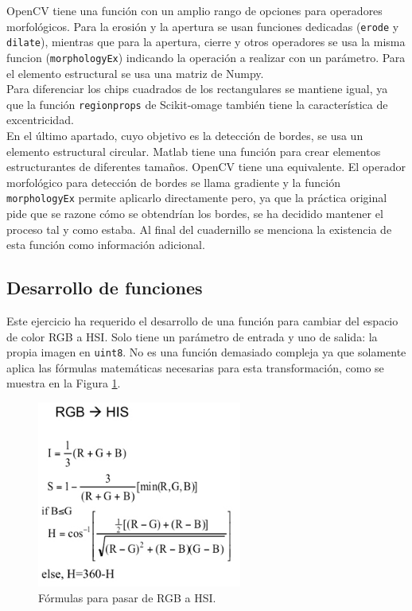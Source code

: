 \documentclass[a4paper,12pt]{report}
\begin{document}
OpenCV tiene una función con un amplio rango de opciones para operadores morfológicos.  Para la erosión y la apertura se usan funciones dedicadas (\texttt{erode} y \texttt{dilate}), mientras que para la apertura, cierre y otros operadores se usa la misma funcion (\texttt{morphologyEx}) indicando la operación a realizar con un parámetro. Para el elemento estructural se usa una matriz de Numpy.\\

Para diferenciar los chips cuadrados de los rectangulares se mantiene igual, ya que la función \texttt{regionprops} de Scikit-omage también tiene la característica de excentricidad.\\

En el último apartado, cuyo objetivo es la detección de bordes, se usa un elemento estructural circular. Matlab  tiene una función para crear elementos  estructurantes de diferentes tamaños. OpenCV tiene una equivalente. El operador morfológico para detección de bordes se llama gradiente y la función \texttt{morphologyEx} permite aplicarlo directamente pero, ya que la práctica original pide que se razone cómo se obtendrían los bordes, se ha decidido mantener el proceso tal y como estaba. Al final del cuadernillo se menciona la existencia de esta función como información adicional.

\subsection{Desarrollo de funciones}

Este ejercicio ha requerido el desarrollo de una función para cambiar del espacio de color RGB a HSI. Solo tiene un parámetro de entrada y uno de salida: la propia imagen en \texttt{uint8}. No es una función demasiado compleja ya que solamente aplica las fórmulas matemáticas necesarias para esta transformación, como se muestra en la Figura \ref{rgb2hsi}.

\begin{figure}[h]
\centering
\includegraphics[width=0.6\textwidth]{imagenes/rgb2hsi}
\caption{Fórmulas para pasar de RGB a HSI.}
\label{rgb2hsi} 
\end{figure}
\end{document}
